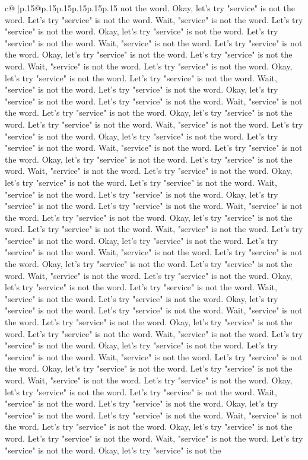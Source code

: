 \documentclass{article}
\begin{document}
{\begin{supertabular}{c@{$\;$}|p{.15\linewidth}@{}p{.15\linewidth}p{.15\linewidth}p{.15\linewidth}p{.15\linewidth}p{.15\linewidth}}
{{{not the word. Okay, let's try "service" is not the word. Let's try "service" is not the word. Wait, "service" is not the word. Let's try "service" is not the word. Okay, let's try "service" is not the word. Let's try "service" is not the word. Wait, "service" is not the word. Let's try "service" is not the word. Okay, let's try "service" is not the word. Let's try "service" is not the word. Wait, "service" is not the word. Let's try "service" is not the word. Okay, let's try "service" is not the word. Let's try "service" is not the word. Wait, "service" is not the word. Let's try "service" is not the word. Okay, let's try "service" is not the word. Let's try "service" is not the word. Wait, "service" is not the word. Let's try "service" is not the word. Okay, let's try "service" is not the word. Let's try "service" is not the word. Wait, "service" is not the word. Let's try "service" is not the word. Okay, let's try "service" is not the word. Let's try "service" is not the word. Wait, "service" is not the word. Let's try "service" is not the word. Okay, let's try "service" is not the word. Let's try "service" is not the word. Wait, "service" is not the word. Let's try "service" is not the word. Okay, let's try "service" is not the word. Let's try "service" is not the word. Wait, "service" is not the word. Let's try "service" is not the word. Okay, let's try "service" is not the word. Let's try "service" is not the word. Wait, "service" is not the word. Let's try "service" is not the word. Okay, let's try "service" is not the word. Let's try "service" is not the word. Wait, "service" is not the word. Let's try "service" is not the word. Okay, let's try "service" is not the word. Let's try "service" is not the word. Wait, "service" is not the word. Let's try "service" is not the word. Okay, let's try "service" is not the word. Let's try "service" is not the word. Wait, "service" is not the word. Let's try "service" is not the word. Okay, let's try "service" is not the word. Let's try "service" is not the word. Wait, "service" is not the word. Let's try "service" is not the word. Okay, let's try "service" is not the word. Let's try "service" is not the word. Wait, "service" is not the word. Let's try "service" is not the word. Okay, let's try "service" is not the word. Let's try "service" is not the word. Wait, "service" is not the word. Let's try "service" is not the word. Okay, let's try "service" is not the word. Let's try "service" is not the word. Wait, "service" is not the word. Let's try "service" is not the word. Okay, let's try "service" is not the word. Let's try "service" is not the word. Wait, "service" is not the word. Let's try "service" is not the word. Okay, let's try "service" is not the word. Let's try "service" is not the word. Wait, "service" is not the word. Let's try "service" is not the word. Okay, let's try "service" is not the word. Let's try "service" is not the word. Wait, "service" is not the word. Let's try "service" is not the word. Okay, let's try "service" is not the word. Let's try "service" is not the word. Wait, "service" is not the word. Let's try "service" is not the word. Okay, let's try "service" is not the }}}
\end{supertabular}}
\end{document}
